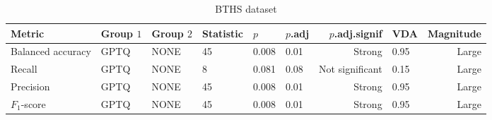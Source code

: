 \begin{table}[ht]
\centering
\caption*{BTHS dataset}
\begin{tabular}{llllllrlr}
\toprule
Metric & Group $1$ & Group $2$ & Statistic & $p$ & $p$.adj & $p$.adj.signif & VDA & Magnitude\\
\midrule
Balanced accuracy & GPTQ & NONE & 45 & 0.008 & 0.01 & Strong & 0.95 & Large \\
\midrule
Recall & GPTQ & NONE & 8 & 0.081 & 0.08 & Not significant & 0.15 & Large \\
\midrule
Precision & GPTQ & NONE & 45 & 0.008 & 0.01 & Strong & 0.95 & Large \\
\midrule
$F_1$-score & GPTQ & NONE & 45 & 0.008 & 0.01 & Strong & 0.95 & Large \\\end{tabular}
\label{tab:RQ1_posthoc_full}
\end{table}

